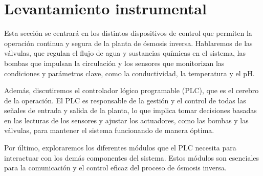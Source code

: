 \section{Levantamiento instrumental}


Esta sección se centrará en los distintos dispositivos de control que permiten la operación continua y
segura de la planta de ósmosis inversa. Hablaremos de las válvulas, que regulan el flujo de agua y sustancias
químicas en el sistema, las bombas que impulsan la circulación y los sensores que monitorizan
las condiciones y parámetros clave, como la conductividad, la temperatura y el pH.

Además, discutiremos el controlador lógico programable (PLC), que es el cerebro de la operación. El PLC es responsable
de la gestión y el control de todas las señales de entrada y salida de la planta, lo que implica tomar decisiones basadas
en las lecturas de los sensores y ajustar los actuadores, como las bombas y las válvulas, para mantener el sistema
funcionando de manera óptima.

Por último, exploraremos los diferentes módulos que el PLC necesita para interactuar con los demás componentes del sistema.
Estos módulos son esenciales para la comunicación y el control eficaz del proceso de ósmosis inversa.




% 


